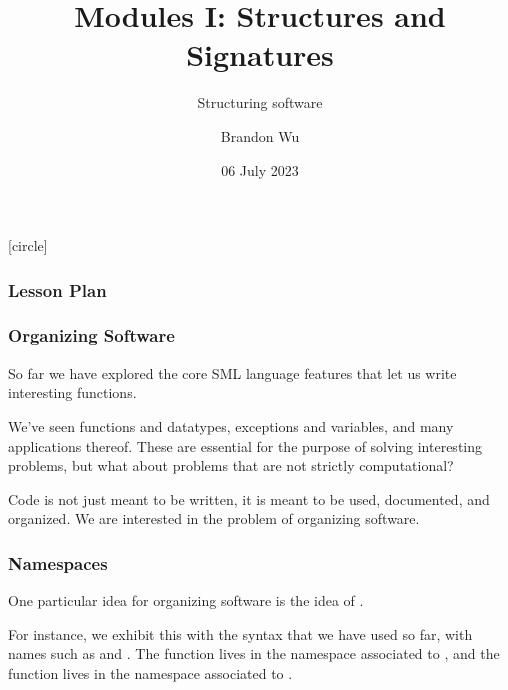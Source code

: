 \documentclass[aspectratio=169, handout]{beamer}
\title{Modules I: Structures and Signatures} %
\subtitle{Structuring software} %
\date{06 July 2023} %
\author{Brandon Wu} %
\newif\ifcolorlambda
\begin{document}
\ifweb
    \renewcommand{\pause}{}
\fi

[circle]

{
\begin{frame}[plain]
    \colorlambdatrue
    \titlepage
\end{frame}
}


\begin{frame}[fragile]
  \frametitle{Lesson Plan}

  \tableofcontents
\end{frame}


\begin{frame}[fragile]
  \frametitle{Organizing Software}

  So far we have explored the core SML language features that let us write
  interesting functions.

  \pause
  \vspace{\fill}

  We've seen functions and datatypes, exceptions and variables, and many
  applications thereof. These are essential for the purpose of solving interesting
  problems, but what about problems that are not strictly computational?

  \pause
  \vspace{\fill}

  Code is not just meant to be written, it is meant to be used,
  documented, and organized. We are interested in the problem of organizing software.
\end{frame}

\begin{frame}[fragile]
  \frametitle{Namespaces}

  One particular idea for organizing software is the idea of .

  \pause
  \vspace{\fill}


  \pause
  \vspace{\fill}

  For instance, we exhibit this with the syntax that we have used so far, with
  names such as  and . The 
  function lives in the namespace associated to , and the 
  function lives in the namespace associated to .

  \pause
  \vspace{\fill}

\end{frame}
\end{document}
